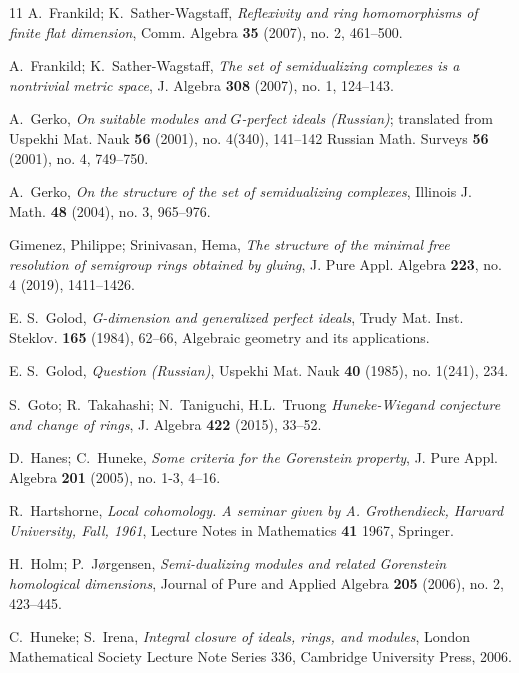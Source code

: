 \documentclass{amsart}
\theoremstyle{plain}
\theoremstyle{definition}
\numberwithin{theorem}{section}
\numberwithin{equation}{section}
\numberwithin{equation}{theorem}
\begin{document}
\begin{thebibliography}{11}
 A.~Frankild; K.~Sather-Wagstaff, \emph{Reflexivity and ring homomorphisms of finite flat dimension}, Comm. Algebra {\bf 35} (2007), no. 2, 461--500. %

 A.~Frankild; K.~Sather-Wagstaff, \emph{The set of semidualizing complexes is a nontrivial metric space}, J. Algebra {\bf 308} (2007), no. 1, 124--143. %

 A.~Gerko, \emph{On suitable modules and $G$-perfect ideals (Russian)}; translated from Uspekhi Mat. Nauk \textbf{56} (2001), no. 4(340), 141--142 Russian Math. Surveys \textbf{56} (2001), no. 4, 749--750. %

A.~Gerko,
\emph{On the structure of the set of semidualizing complexes}, Illinois J. Math. {\bf 48} (2004), no. 3, 965--976. %

Gimenez, Philippe; Srinivasan, Hema, \emph{The structure of the minimal free resolution of semigroup rings obtained by gluing}, J. Pure Appl. Algebra {\bf 223}, no. 4 (2019), 1411--1426. %

 E. S.~Golod, \emph{G-dimension and generalized perfect ideals}, Trudy Mat. Inst. Steklov. {\bf 165} (1984), 62--66, Algebraic geometry and its applications. %

 E. S.~Golod, \emph{Question (Russian)}, Uspekhi Mat. Nauk \textbf{40} (1985), no. 1(241), 234.

 S.~Goto; R.~Takahashi; N.~Taniguchi, H.L.~Truong \emph{Huneke-{W}iegand conjecture and change of rings}, J. Algebra {\bf 422} (2015), 33--52.  %

D.~Hanes; C.~Huneke, \emph{Some criteria for the Gorenstein property}, J. Pure Appl. Algebra {\bf 201} (2005), no. 1-3, 4--16. %

 R.~Hartshorne, \emph{Local cohomology. A seminar given by A. Grothendieck, Harvard University, Fall, 1961}, Lecture Notes in Mathematics {\bf 41} 1967, Springer. 

 H.~Holm; P.~J{\o}rgensen, \emph{Semi-dualizing modules and related Gorenstein homological dimensions}, Journal of Pure and Applied Algebra {\bf 205} (2006), no. 2, 423--445.

 C.~Huneke; S.~Irena, \emph{Integral closure of ideals, rings, and modules}, London Mathematical Society Lecture Note Series 336, Cambridge University Press, 2006. %


\end{thebibliography}
\end{document}
